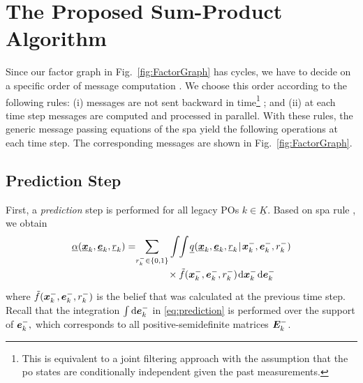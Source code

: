 \documentclass[10pt, twoside, romanappendices]{IEEEtran}
\providecommand{\ist}{\hspace*{.3mm}}
\providecommand{\rmv}{\hspace*{-.3mm}}
\providecommand{\rrmv}{\hspace*{-1mm}}
\providecommand{\nn}{\nonumber}
\begin{document}
\section{The Proposed Sum-Product Algorithm}
\label{sec:proposedSPA}

Since our factor graph in Fig.~\ref{fig:FactorGraph} has cycles, we have to decide on a specific order of message computation \cite{KscFreLoe:01}. We choose this order according to the following rules: 
(i) messages are not sent backward in 
time\footnote{This %
is equivalent to a joint filtering approach with the assumption that the \ac{po} states are conditionally independent given the past measurements.} %
\cite{MeyBraWilHla:J17,MeyKroWilLauHlaBraWin:J18}; and (ii) at each time step messages are computed and processed in parallel. With these rules, the generic message passing equations of the \ac{spa} \cite{KscFreLoe:01}
yield the following operations at each time step. The corresponding messages are shown in \vspace{-2mm}Fig.~\ref{fig:FactorGraph}.

\subsection{Prediction Step}
\label{sec:predictionStep}

First, a \emph{prediction} step is performed for all legacy POs $k \in \underline{K}$. Based on \ac{spa} rule \cite[Eq.~(6)]{KscFreLoe:01}, we\vspace{.5mm} obtain
\begin{align}
\underline{\alpha}(\underline{\V{x}}_{k}, \underline{\V{e}}_{k}, \underline{r}_{k}) &= \rrmv \sum_{r^{-}_{k} \in \{0,1\}}\int \rmv\rmv\rmv \int \rmv \underline{q}( \underline{\V{x}}_{k}, \underline{\V{e}}_{k}, \underline{r}_{k} \ist|\ist \V{x}^{-}_{k}, \V{e}^{-}_{k}, r^{-}_{k})\nn\\[-.5mm]
&\hspace{15mm} \times \tilde{f}(\V{x}^{-}_{k}, \V{e}^{-}_{k}, r^{-}_{k}) \ist \mathrm{d}\V{x}^{-}_{k} \ist \mathrm{d}\V{e}^{-}_{k} \label{eq:prediction} \\[-4.5mm] \nn
\end{align}
where $\tilde{f}(\bm{x}^{-}_{k}, \bm{e}^{-}_{k}, r^{-}_{k})$ is the belief that was calculated at the previous time step. Recall that the integration $\int \mathrm{d}\bm{e}^{-}_{k}$ in \eqref{eq:prediction} is performed over the support of $\bm{e}^{-}_{k},$ which corresponds to all positive-semidefinite matrices $\M{E}^{-}_{k}$. 
\end{document}
